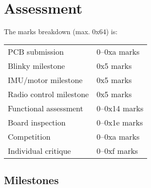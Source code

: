 \documentclass[11pt, a4paper]{article}
\begin{document}
\section{Assessment}

The marks breakdown (max. 0x64) is:
%
\begin{flushleft}
  \begin{tabular}{ll}
    PCB submission & 0--0xa marks\\
    Blinky milestone  & 0x5 marks\\
    IMU/motor milestone  & 0x5 marks\\
    Radio control milestone  & 0x5 marks\\
    Functional assessment & 0--0x14 marks \\
    Board inspection & 0--0x1e marks \\
    Competition & 0--0xa marks \\
    Individual critique & 0--0xf marks \\
  \end{tabular}

\end{flushleft}

\subsection{Milestones}
\end{document}
